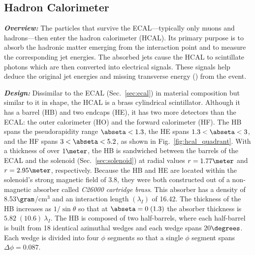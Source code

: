 \subsection{Hadron Calorimeter}
\label{sec:hcal}

\textit{\textbf{Overview:}}
The particles that survive the ECAL---typically only muons and hadrons---then enter the hadron calorimeter (HCAL).
Its primary purpose is to absorb the hadronic matter emerging from the interaction point and to measure the corresponding jet energies.
The absorbed jets cause the HCAL to scintillate photons which are then converted into electrical signals.
These signals help deduce the original jet energies and missing transverse energy (\MET) from the event.

\textit{\textbf{Design:}}
Dissimilar to the ECAL (Sec.~\ref{sec:ecal}) in material composition but similar to it in shape, the HCAL is a brass cylindrical scintillator.
Although it has a barrel (HB) and two endcaps (HE), it has two more detectors than the ECAL: the outer calorimeter (HO) and the forward calorimeter (HF).
The HB spans the pseudorapidity range $\abseta < 1.3$, the HE spans $1.3 < \abseta < 3$, and the HF spans $3 < \abseta < 5.2$, as shown in Fig.~\ref{fig:hcal_quadrant}.
With a thickness of over $1\meter$, the HB is sandwiched between the barrels of the ECAL and the solenoid (Sec.~\ref{sec:solenoid}) at radial values $r = 1.77\meter$ and $r = 2.95\meter$, respectively.
Because the HB and HE are located within the solenoid's strong magnetic field of 3.8\tesla, they were both constructed out of a non-magnetic absorber called \emph{C26000 cartridge brass}.
This absorber has a density of 8.53$\gram$/cm$^{3}$ and an interaction length $(\lambda_I)$ of 16.42\cm.
The thickness of the HB increases as $1/\sin{\theta}$ so that at $\abseta = 0\;(1.3)$ the absorber thickness is $5.82\;(10.6)~\lambda_I$.
The HB is composed of two half-barrels, where each half-barrel is built from 18 identical azimuthal wedges and each wedge spans 20$\degrees$.
Each wedge is divided into four $\phi$ segments so that a single $\phi$ segment spans $\Delta \phi = 0.087$.

